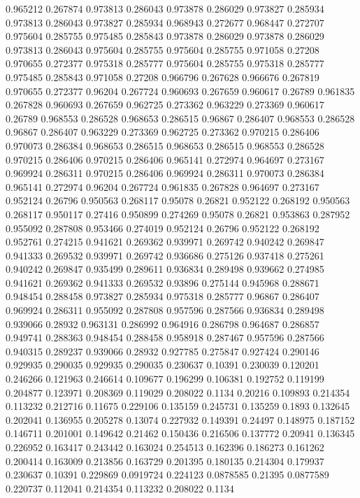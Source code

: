 0.965212 0.267874
0.973813 0.286043
0.973878 0.286029
0.973827 0.285934
0.973813 0.286043
0.973827 0.285934
0.968943 0.272677
0.968447 0.272707
0.975604 0.285755
0.975485 0.285843
0.973878 0.286029
0.973878 0.286029
0.973813 0.286043
0.975604 0.285755
0.975604 0.285755
0.971058 0.27208
0.970655 0.272377
0.975318 0.285777
0.975604 0.285755
0.975318 0.285777
0.975485 0.285843
0.971058 0.27208
0.966796 0.267628
0.966676 0.267819
0.970655 0.272377
0.96204 0.267724
0.960693 0.267659
0.960617 0.26789
0.961835 0.267828
0.960693 0.267659
0.962725 0.273362
0.963229 0.273369
0.960617 0.26789
0.968553 0.286528
0.968653 0.286515
0.96867 0.286407
0.968553 0.286528
0.96867 0.286407
0.963229 0.273369
0.962725 0.273362
0.970215 0.286406
0.970073 0.286384
0.968653 0.286515
0.968653 0.286515
0.968553 0.286528
0.970215 0.286406
0.970215 0.286406
0.965141 0.272974
0.964697 0.273167
0.969924 0.286311
0.970215 0.286406
0.969924 0.286311
0.970073 0.286384
0.965141 0.272974
0.96204 0.267724
0.961835 0.267828
0.964697 0.273167
0.952124 0.26796
0.950563 0.268117
0.95078 0.26821
0.952122 0.268192
0.950563 0.268117
0.950117 0.27416
0.950899 0.274269
0.95078 0.26821
0.953863 0.287952
0.955092 0.287808
0.953466 0.274019
0.952124 0.26796
0.952122 0.268192
0.952761 0.274215
0.941621 0.269362
0.939971 0.269742
0.940242 0.269847
0.941333 0.269532
0.939971 0.269742
0.936686 0.275126
0.937418 0.275261
0.940242 0.269847
0.935499 0.289611
0.936834 0.289498
0.939662 0.274985
0.941621 0.269362
0.941333 0.269532
0.93896 0.275144
0.945968 0.288671
0.948454 0.288458
0.973827 0.285934
0.975318 0.285777
0.96867 0.286407
0.969924 0.286311
0.955092 0.287808
0.957596 0.287566
0.936834 0.289498
0.939066 0.28932
0.963131 0.286992
0.964916 0.286798
0.964687 0.286857
0.949741 0.288363
0.948454 0.288458
0.958918 0.287467
0.957596 0.287566
0.940315 0.289237
0.939066 0.28932
0.927785 0.275847
0.927424 0.290146
0.929935 0.290035
0.929935 0.290035
0.230637 0.10391
0.230039 0.120201
0.246266 0.121963
0.246614 0.109677
0.196299 0.106381
0.192752 0.119199
0.204877 0.123971
0.208369 0.119029
0.208022 0.1134
0.20216 0.109893
0.214354 0.113232
0.212716 0.11675
0.229106 0.135159
0.245731 0.135259
0.1893 0.132645
0.202041 0.136955
0.205278 0.13074
0.227932 0.149391
0.24497 0.148975
0.187152 0.146711
0.201001 0.149642
0.21462 0.150436
0.216506 0.137772
0.20941 0.136345
0.226952 0.163417
0.243442 0.163024
0.254513 0.162396
0.186273 0.161262
0.200414 0.163009
0.213856 0.163729
0.201395 0.180135
0.214304 0.179937
0.230637 0.10391
0.229869 0.0919724
0.224123 0.0878585
0.21395 0.0877589
0.220737 0.112041
0.214354 0.113232
0.208022 0.1134
